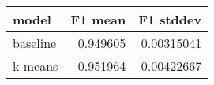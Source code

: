 \begin{tabular}{lrr}
\toprule
 model    &   F1 mean &   F1 stddev \\
\midrule
 baseline &  0.949605 &  0.00315041 \\
 k-means  &  0.951964 &  0.00422667 \\
\bottomrule
\end{tabular}